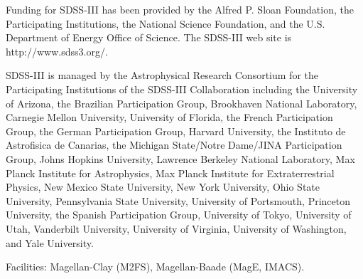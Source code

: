 \documentclass{emulateapj-rtx4}
\begin{document}
Funding for SDSS-III has been provided by the Alfred P. Sloan Foundation, the Participating Institutions, the National Science Foundation, and the U.S. Department of Energy Office of Science. The SDSS-III web site is http://www.sdss3.org/.

SDSS-III is managed by the Astrophysical Research Consortium for the Participating Institutions of the SDSS-III Collaboration including the University of Arizona, the Brazilian Participation Group, Brookhaven National Laboratory, Carnegie Mellon University, University of Florida, the French Participation Group, the German Participation Group, Harvard University, the Instituto de Astrofisica de Canarias, the Michigan State/Notre Dame/JINA Participation Group, Johns Hopkins University, Lawrence Berkeley National Laboratory, Max Planck Institute for Astrophysics, Max Planck Institute for Extraterrestrial Physics, New Mexico State University, New York University, Ohio State University, Pennsylvania State University, University of Portsmouth, Princeton University, the Spanish Participation Group, University of Tokyo, University of Utah, Vanderbilt University, University of Virginia, University of Washington, and Yale University.

\indent Facilities: Magellan-Clay (M2FS), Magellan-Baade (MagE, IMACS).





\end{document}
